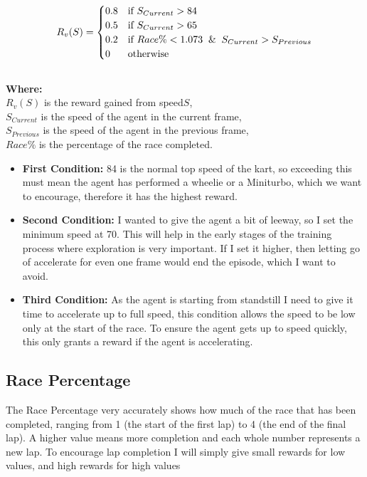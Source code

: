 \documentclass{article}
\begin{document}
\[
R_{v}(S) =
\begin{cases}
  0.8 & \text{if } S_{Current} > 84 \\
  0.5 & \text{if } S_{Current} > 65 \\
  0.2 & \text{if } Race\% < 1.073 \And S_{Current} > S_{Previous} \\
  0 & \text{otherwise }
\end{cases}
\]
\\
\textbf{Where:}\\ $R_{v}(S)$ is the reward gained from speed$S$,
\\$S_{Current}$ is the speed of the agent in the current frame,
\\$S_{Previous}$ is the speed of the agent in the previous frame,
\\$Race\%$ is the percentage of the race completed.
\\
\begin{itemize}
    \item \textbf{First Condition:}
    84 is the normal top speed of the kart, so exceeding this must mean the agent has performed a wheelie or a Miniturbo, which we want to encourage, therefore it has the highest reward.
    \item \textbf{Second Condition:}
    I wanted to give the agent a bit of leeway, so I set the minimum speed at 70. This will help in the early stages of the training process where exploration is very important. If I set it higher, then letting go of accelerate for even one frame would end the episode, which I want to avoid.
    \item \textbf{Third Condition:} As the agent is starting from standstill I need to give it time to accelerate up to full speed, this condition allows the speed to be low only at the start of the race. To ensure the agent gets up to speed quickly, this only grants a reward if the agent is accelerating.
\end{itemize}
 
\subsection{Race Percentage}
The Race Percentage very accurately shows how much of the race that has been completed, ranging from 1 (the start of the first lap) to 4 (the end of the final lap). A higher value means more completion and each whole number represents a new lap. To encourage lap completion I will simply give small rewards for low values, and high rewards for high values
\end{document}
